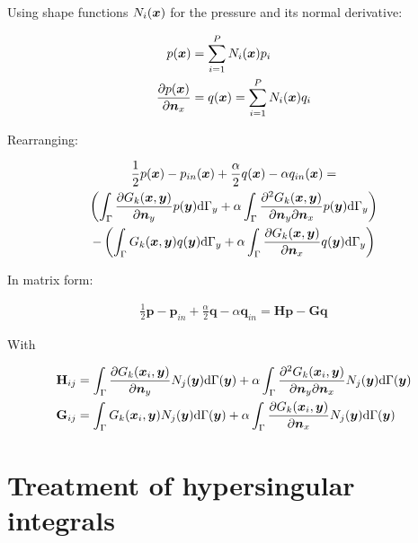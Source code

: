 \documentclass[a4paper, 10pt]{article}
\newcommand{\td}{\mathrm{d}}
\newcommand{\sx}{\bm{\mathnormal{x}}}
\newcommand{\sy}{\bm{\mathnormal{y}}}
\newcommand{\sn}{\bm{\mathnormal{n}}}
\newcommand{\bp}{\mathbf{p}}
\newcommand{\bq}{\mathbf{q}}
\newcommand{\bH}{\mathbf{H}}
\newcommand{\bG}{\mathbf{G}}
\begin{document}
Using shape functions $N_i(\sx)$ for the pressure and its normal derivative:

\begin{align}
	p(\sx) & = \sum\limits_{i=1}^P N_i(\sx)p_i \\
	\frac{\partial p(\sx)}{\partial \sn_x} & = q(\sx) = \sum\limits_{i=1}^P N_i(\sx)q_i
\end{align}

Rearranging:

\begin{multline}
	\frac{1}{2} p (\sx)
	-
	p_{in}(\sx)
	+
	\frac{\alpha}{2} q(\sx)
	-
	\alpha q_{in}(\sx)
	= \\
	\left(
	\int_{\Gamma} \frac{\partial{G}_k (\sx, \sy)}{\partial \sn_y} p(\sy) \td \Gamma_y
	+
	\alpha \int_{\Gamma}
	\frac{\partial^2{G}_k (\sx, \sy)}{\partial \sn_y \partial \sn_x} p(\sy) \td \Gamma_y
	\right)
	\\
	-
	\left(
	\int_{\Gamma} G_k(\sx,\sy) q(\sy) \td \Gamma_y
	+
	\alpha \int_{\Gamma}
	\frac{\partial G_k(\sx,\sy)}{\partial \sn_x}q(\sy) \td \Gamma_y
	\right)
\end{multline}

In matrix form:

\begin{align}
	\frac{1}{2} \mathbf{p} - \mathbf{p}_{in} + \frac{\alpha}{2} \mathbf{q} - \alpha \mathbf{q}_{in} = \bH \bp - \bG \bq
\end{align}

With

\begin{align}
	\bH_{ij}
	& = \int_{\Gamma}\frac{\partial{G}_k (\sx_i, \sy)}{\partial \sn_y} N_j(\sy) \td \Gamma(\sy)
	+ \alpha \int_\Gamma \frac{\partial^2{G}_k (\sx_i, \sy)}{\partial \sn_y \partial \sn_x} N_j(\sy) \td \Gamma(\sy) \nonumber \\
	\bG_{ij}
	& = \int_{\Gamma} G_k(\sx_i,\sy) N_j(\sy) \td \Gamma(\sy)
	+ \alpha \int_\Gamma \frac{\partial{G}_k (\sx_i, \sy)}{\partial \sn_x} N_j(\sy) \td \Gamma(\sy)
\end{align}




\section{Treatment of hypersingular integrals}
\end{document}

